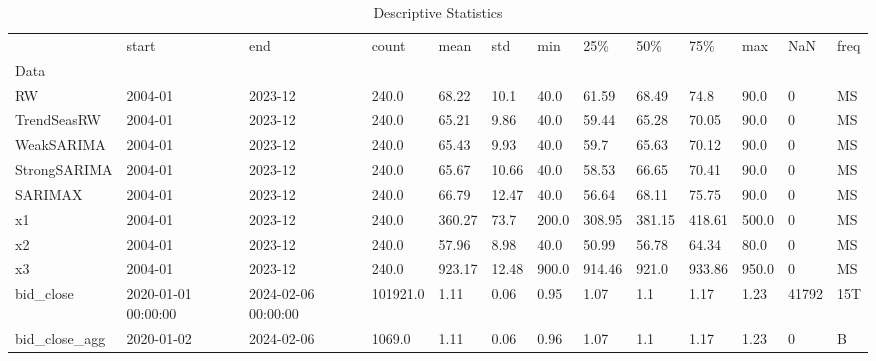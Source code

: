 \begin{table}
\caption{Descriptive Statistics}
\begin{tabular}{lllllllllllll}
\toprule
 & start & end & count & mean & std & min & 25\% & 50\% & 75\% & max & NaN & freq \\
Data &  &  &  &  &  &  &  &  &  &  &  &  \\
\midrule
RW & 2004-01 & 2023-12 & 240.0 & 68.22 & 10.1 & 40.0 & 61.59 & 68.49 & 74.8 & 90.0 & 0 & MS \\
TrendSeasRW & 2004-01 & 2023-12 & 240.0 & 65.21 & 9.86 & 40.0 & 59.44 & 65.28 & 70.05 & 90.0 & 0 & MS \\
WeakSARIMA & 2004-01 & 2023-12 & 240.0 & 65.43 & 9.93 & 40.0 & 59.7 & 65.63 & 70.12 & 90.0 & 0 & MS \\
StrongSARIMA & 2004-01 & 2023-12 & 240.0 & 65.67 & 10.66 & 40.0 & 58.53 & 66.65 & 70.41 & 90.0 & 0 & MS \\
SARIMAX & 2004-01 & 2023-12 & 240.0 & 66.79 & 12.47 & 40.0 & 56.64 & 68.11 & 75.75 & 90.0 & 0 & MS \\
x1 & 2004-01 & 2023-12 & 240.0 & 360.27 & 73.7 & 200.0 & 308.95 & 381.15 & 418.61 & 500.0 & 0 & MS \\
x2 & 2004-01 & 2023-12 & 240.0 & 57.96 & 8.98 & 40.0 & 50.99 & 56.78 & 64.34 & 80.0 & 0 & MS \\
x3 & 2004-01 & 2023-12 & 240.0 & 923.17 & 12.48 & 900.0 & 914.46 & 921.0 & 933.86 & 950.0 & 0 & MS \\
bid_close & 2020-01-01 00:00:00 & 2024-02-06 00:00:00 & 101921.0 & 1.11 & 0.06 & 0.95 & 1.07 & 1.1 & 1.17 & 1.23 & 41792 & 15T \\
bid_close_agg & 2020-01-02 & 2024-02-06 & 1069.0 & 1.11 & 0.06 & 0.96 & 1.07 & 1.1 & 1.17 & 1.23 & 0 & B \\
\bottomrule
\end{tabular}
\end{table}

